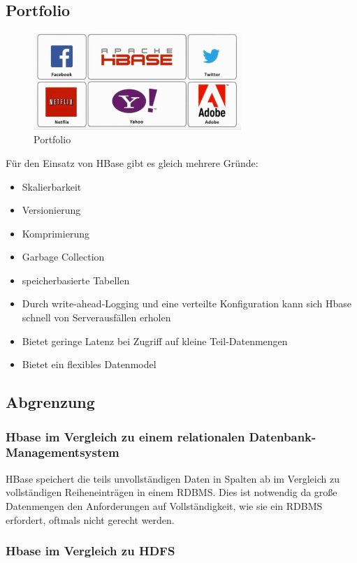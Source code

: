 \subsection{Portfolio}
\begin{figure}[htbp] 
  \centering
     \includegraphics[width=0.7\textwidth]{images/portfolio.png}
  \caption{Portfolio}
  \label{fig:Portfolio}
\end{figure}
Für den Einsatz von HBase gibt es gleich mehrere Gründe:
\begin{itemize}

\item Skalierbarkeit
\item Versionierung
\item Komprimierung
\item Garbage Collection
\item speicherbasierte Tabellen
\item Durch write-ahead-Logging und eine verteilte Konfiguration kann sich Hbase schnell von Serverausfällen erholen
\item Bietet geringe Latenz bei Zugriff auf kleine Teil-Datenmengen 
\item Bietet ein flexibles Datenmodel
\end{itemize}

\subsection{Abgrenzung}
\subsubsection{Hbase im Vergleich zu einem relationalen Datenbank-Managementsystem}
HBase speichert die teils unvollständigen Daten in Spalten ab im Vergleich zu vollständigen Reiheneinträgen in einem RDBMS. Dies ist notwendig da große Datenmengen den Anforderungen auf Vollständigkeit, wie sie ein RDBMS erfordert, oftmals nicht gerecht werden.  
\subsubsection{Hbase im Vergleich zu HDFS}


